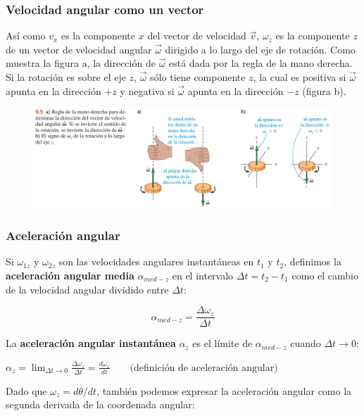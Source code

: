 \documentclass{article}
\newcommand{\newtitle}[1]{
    \color{titleColor}
    \subsubsection{#1}
    \color{black}
}
\newcommand{\bl}[1]{\textbf{#1}}
\newcommand{\definicion}[1]{%
    \vspace{0.5cm}
    \begin{definicionbox}
        #1
    \end{definicionbox}
    \vspace{0.5cm}
}
\begin{document}
    \pagebreak

    \newtitle{Velocidad angular como un vector}

    \par Así como $v_x$ es la componente $x$ del vector de velocidad $\vec{v}$, $\omega_z$ es la componente $z$ de un vector de velocidad angular $\vec{\omega}$ dirigido a lo largo del eje de rotación. Como muestra la ﬁgura a, la dirección de $\vec{\omega}$ está dada por la regla de la mano derecha. Si la rotación es sobre el eje $z$, $\vec{\omega}$ sólo tiene componente $z$, la cual es positiva si $\vec{\omega}$ apunta en la dirección $+z$ y negativa si $\vec{\omega}$ apunta en la dirección $-z$ (ﬁgura b).

    \begin{figure}[H]
        \centering
        \includegraphics[width=\textwidth]{img/8.1-1.png}
    \end{figure}

    \newtitle{Aceleración angular}

    \par Si $\omega_{1z}$ y $\omega_{2z}$ son las velocidades angulares instantáneas en $t_1$ y $t_2$, deﬁnimos la \bl{aceleración angular media} $\alpha_{med-z}$ en el intervalo $\Delta t = t_2 - t_1$ como el cambio de la velocidad angular dividido entre $\Delta t$:

    \[ \alpha_{med-z} = \frac{\Delta \omega_z}{\Delta t} \]

    \par La \bl{aceleración angular instantánea} $\alpha_z$ es el límite de $\alpha_{med-z}$ cuando $\Delta t \to 0$:

    \definicion{
        \centering
        \( \alpha_z = \lim_{\Delta t \to 0} \frac{\Delta \omega_z}{\Delta t} = \frac{d\omega_z}{dt} \quad \quad \text{(deﬁnición de aceleración angular)} \)
    }

    \par Dado que $\omega_z = d\theta/dt$, también podemos expresar la aceleración angular como la segunda derivada de la coordenada angular:
\end{document}
